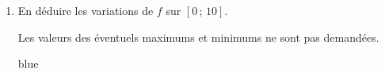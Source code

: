 \documentclass[10pt]{article}
\begin{document}
\begin{enumerate}
\begin{color}{blue}
		 
				
		\end{color}
		
		\item En déduire les variations de $f$ sur $[0\,;\,10]$.
		
		Les valeurs des éventuels maximums et minimums ne sont pas demandées.
		
		\begin{color}{blue}
		\begin{center}
		\end{center}
		\end{color}
		
	\end{enumerate}
\end{document}

